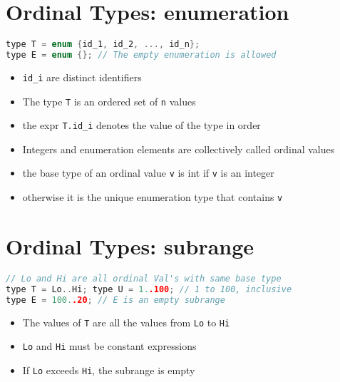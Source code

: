 \documentclass[10pt,a4paper,landscape]{article}
\begin{document}
\pagestyle{empty}

\begin{multicols*}{3}
\section*{Ordinal Types: enumeration}
\begin{lstlisting}[language=c]
type T = enum {id_1, id_2, ..., id_n};
type E = enum {}; // The empty enumeration is allowed
\end{lstlisting}
\begin{itemize}
\item \texttt{id\_i} are distinct identifiers
\item The type \texttt{T} is an ordered set of \texttt{n} values
\item the expr \texttt{T.id\_i} denotes the  value of the type in  order
\item Integers and enumeration elements are collectively called ordinal values
\item the base type of an ordinal value \texttt{v} is int if \texttt{v} is an integer
\item otherwise it is the unique enumeration type that contains \texttt{v}
\end{itemize}
\section*{Ordinal Types: subrange}
\begin{lstlisting}[language=c]
// Lo and Hi are all ordinal Val's with same base type
type T = Lo..Hi; type U = 1..100; // 1 to 100, inclusive
type E = 100..20; // E is an empty subrange
\end{lstlisting}
\begin{itemize}
\item The values of \texttt{T} are all the values from \texttt{Lo} to \texttt{Hi} 
\item \texttt{Lo} and \texttt{Hi} must be constant expressions
\item If \texttt{Lo} exceeds \texttt{Hi}, the subrange is empty
\end{itemize}

\end{multicols*}
\end{document}
